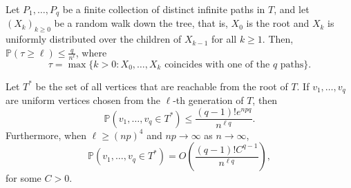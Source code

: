 \documentclass[10pt,a4paper]{amsart}
\newcommand{\prob}{\mathbb{P}} %
\begin{document}
\begin{lemma}\label{treesep}
Let $P_1,\ldots,P_q$ be a finite collection of distinct infinite paths in $T$, and let $(X_k)_{k \geq 0}$ be a random walk down the tree, that is, $X_0$ is the root and $X_k$ is uniformly distributed over the children of $X_{k-1}$ for all $k \geq 1$. Then, $\prob(\tau \geq \ell) \leq \frac{q}{n^\ell}$, where
$$\tau = \max\{ k > 0 : X_0,\ldots,X_k \text{ coincides with one of the $q$ paths}\}.$$
\end{lemma}

\begin{lemma}\label{treesurvival}
Let $T^*$ be the set of all vertices that are reachable from the root of $T$. If $v_1,\ldots,v_q$ are uniform vertices chosen from the $\ell$-th generation of $T$, then
$$\prob(v_1,\ldots,v_q \in T^*) \leq \frac{(q-1)!e^{npq}}{n^{\ell q}}.$$
Furthermore, when $\ell \geq (np)^4$ and $np \to \infty$ as $n \to \infty$,
$$\prob(v_1,\ldots,v_q \in T^*) = O\left(\frac{(q-1)!C^{q-1}}{n^{\ell q}}\right),$$
for some $C > 0$.
\end{lemma}
\end{document}

